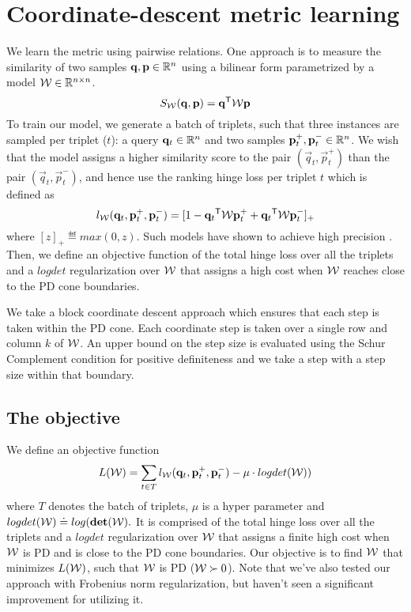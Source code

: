 \documentclass{article}
\begin{document}
\section{Coordinate-descent metric learning}
We learn the metric using pairwise relations. One approach is to measure the similarity of two samples $\mathbf{q}, \mathbf{p} \in \mathbb{R}^n$ using a bilinear form parametrized by a model $\mathcal{W} \in \mathbb{R}^{n\times n}$.
\begin{equation}
S_{\mathcal{W}}(\mathbf{q}, \mathbf{p}) = \mathbf{q}{}^\mathsf{T} \mathcal{W} \mathbf{p}
\end{equation}
To train our model, we generate a batch of triplets, such that three instances are sampled per triplet ($t$): a query $\mathbf{q}_t \in \mathbb{R}^n$ and two samples $\mathbf{p}_{t}^{+}, \mathbf{p}_{t}^{-} \in \mathbb{R}^n$. We wish that the model assigns a higher similarity score to the pair $(\vec{q}_t, \vec{p}_{t}^{+})$ than the pair $(\vec{q}_t, \vec{p}_{t}^{-})$, and hence use the ranking hinge loss per triplet $t$ which is defined as
\begin{equation}
l_{\mathcal{W}}(\mathbf{q}_t, \mathbf{p}_{t}^{+}, \mathbf{p}_{t}^{-})=[1-\mathbf{q}_{t}{}^\mathsf{T} \mathcal{W} \mathbf{p}_{t}^{+}+\mathbf{q}_{t}{}^\mathsf{T}\mathcal{W}\mathbf{p}_{t}^{-}]_{+}
\label{hingelt}
\end{equation}
where $[z]_{+} \eqdef max(0,z)$. Such models have shown to achieve high precision \cite{oasis, qian}.
Then, we define an objective function of the total hinge loss over all the triplets and a $logdet$ regularization over $\mathcal{W}$ that assigns a high cost when $\mathcal{W}$ reaches close to the PD cone boundaries. 

We take a block coordinate descent approach which ensures that each step is taken within the PD cone. Each coordinate step is taken over a single row and column $k$ of $\mathcal{W}$. An upper bound on the step size is  evaluated using the Schur Complement condition for positive definiteness  and we take a step with a step size within that boundary. 

\subsection{The objective}
We define an objective function 
\begin{equation}
L(\mathcal{W})=\sum\limits_{t\in T}{l_{\mathcal{W}}(\mathbf{q}_t, \mathbf{p}_{t}^{+}, \mathbf{p}_{t}^{-})} - \mu \cdot logdet(\mathcal{W}) ) 
\end{equation}
where $T$ denotes the batch of triplets, $\mu$ is a hyper parameter and $logdet(\mathcal{W}) \doteq log (\textbf{det}(\mathcal{W}).$ It is comprised of the total hinge loss over all the triplets and a $logdet$ regularization over $\mathcal{W}$ that assigns a finite high cost when $\mathcal{W}$ is PD and is close to the PD cone boundaries. 
Our objective is to find $\mathcal{W}$ that minimizes $L(\mathcal{W})$, such that $\mathcal{W}$ is PD ($\mathcal{W}\succ 0$). Note that we've also tested our approach with Frobenius norm regularization, but haven't seen a significant improvement for utilizing it.
\end{document}
